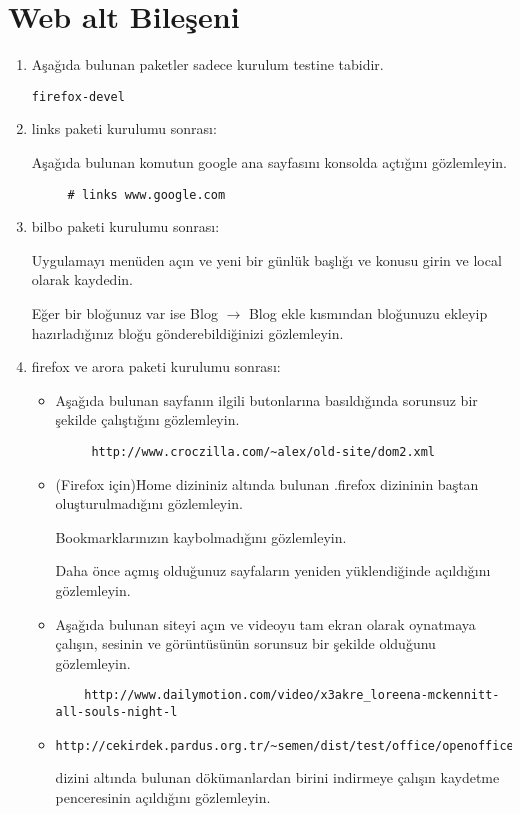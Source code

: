 \documentclass[a4paper,10pt]{article}
\begin{document}
\section{Web alt Bileşeni}
\begin{enumerate}
\item Aşağıda bulunan paketler sadece kurulum testine tabidir.
\begin{verbatim}
firefox-devel 
\end{verbatim}


\item links paketi kurulumu sonrası:

  Aşağıda bulunan komutun google ana sayfasını konsolda açtığını gözlemleyin.
	\begin{verbatim}
	 # links www.google.com
	\end{verbatim}

\item bilbo paketi kurulumu sonrası:

Uygulamayı menüden açın ve yeni bir günlük başlığı ve konusu girin ve local olarak kaydedin. 

Eğer bir bloğunuz var ise Blog $\rightarrow$ Blog ekle kısmından bloğunuzu ekleyip hazırladığınız bloğu gönderebildiğinizi gözlemleyin.
\item firefox ve arora paketi kurulumu sonrası:
\begin{itemize}
 \item Aşağıda bulunan sayfanın ilgili butonlarına basıldığında sorunsuz bir şekilde çalıştığını gözlemleyin.
	\begin{verbatim}
	 http://www.croczilla.com/~alex/old-site/dom2.xml
	\end{verbatim}
 \item (Firefox için)Home dizininiz altında bulunan .firefox dizininin baştan oluşturulmadığını gözlemleyin.
	
	Bookmarklarınızın kaybolmadığını gözlemleyin.
	
 	Daha önce açmış olduğunuz sayfaların yeniden yüklendiğinde açıldığını gözlemleyin.

\item Aşağıda bulunan siteyi açın ve videoyu tam ekran olarak oynatmaya çalışın, sesinin ve görüntüsünün sorunsuz bir şekilde olduğunu gözlemleyin.
	\begin{verbatim}
	http://www.dailymotion.com/video/x3akre_loreena-mckennitt-all-souls-night-l 
	\end{verbatim}
\item \begin{verbatim}http://cekirdek.pardus.org.tr/~semen/dist/test/office/openoffice/\end{verbatim} dizini altında bulunan dökümanlardan birini indirmeye çalışın kaydetme penceresinin açıldığını gözlemleyin.


\end{itemize}
\end{enumerate}
\end{document}
